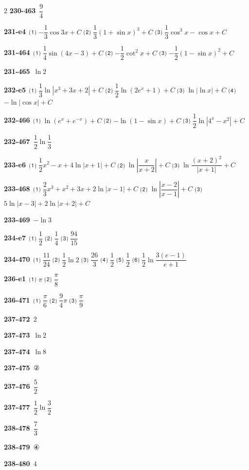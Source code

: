 \documentclass[10pt,a4paper]{article}
\begin{document}
\begin{multicols}{2}
\noindent\textbf{230-463}\ $\dfrac{9}{4}$\par
\noindent\textbf{231-e4}\ ⑴ $-\dfrac{1}{3}\cos 3x+C$ ⑵ $\dfrac{1}{3}(1+\sin x)^3+C$ ⑶ $\dfrac{1}{3}\cos^3 x-\cos x+C$\par
\noindent\textbf{231-464}\ ⑴ $\dfrac{1}{4}\sin(4x-3)+C$ ⑵ $-\dfrac{1}{2}\cot^2 x+C$ ⑶ $-\dfrac{1}{2}(1-\sin x)^2+C$\par
\noindent\textbf{231-465}\ $\ln 2$\par
\noindent\textbf{232-e5}\ ⑴ $\dfrac{1}{3}\ln|x^3+3x+2|+C$ ⑵ $\dfrac{1}{2}\ln(2e^x+1)+C$ ⑶ $\ln|\ln x|+C$ ⑷ $-\ln|\cos x|+C$\par
\noindent\textbf{232-466}\ ⑴ $\ln(e^x+e^{-x})+C$ ⑵ $-\ln(1-\sin x)+C$ ⑶ $\dfrac{1}{2}\ln|4^x-x^2|+C$\par
\noindent\textbf{232-467}\ $\dfrac{1}{2}\ln\dfrac{1}{3}$\par
\noindent\textbf{233-e6}\ ⑴ $\dfrac{1}{2}x^2-x+4\ln|x+1|+C$ ⑵ $\ln\left|\dfrac{x}{x+2}\right|+C$ ⑶ $\ln\dfrac{(x+2)^2}{|x+1|}+C$\par
\noindent\textbf{233-468}\ ⑴ $\dfrac{2}{3}x^3+x^2+3x+2\ln|x-1|+C$ ⑵ $\ln\left|\dfrac{x-2}{x-1}\right|+C$ ⑶ $5\ln|x-3|+2\ln|x+2|+C$\par
\noindent\textbf{233-469}\ $-\ln 3$\par
\noindent\textbf{234-e7}\ ⑴ $\dfrac{1}{2}$ ⑵ $\dfrac{1}{4}$ ⑶ $\dfrac{94}{15}$\par
\noindent\textbf{234-470}\ ⑴ $\dfrac{11}{24}$ ⑵ $\dfrac{1}{2}\ln 2$ ⑶ $\dfrac{26}{3}$ ⑷ $\dfrac{1}{2}$ ⑸ $\dfrac{1}{2}$ ⑹ $\dfrac{1}{2}\ln\dfrac{3(e-1)}{e+1}$\par
\noindent\textbf{236-e1}\ ⑴ $\pi$ ⑵ $\dfrac{\pi}{8}$\par
\noindent\textbf{236-471}\ ⑴ $\dfrac{\pi}{6}$ ⑵ $\dfrac{9}{4}\pi$ ⑶ $\dfrac{\pi}{9}$\par
\noindent\textbf{237-472}\ $2$\par
\noindent\textbf{237-473}\ $\ln 2$\par
\noindent\textbf{237-474}\ $\ln 8$\par
\noindent\textbf{237-475}\ ②\par
\noindent\textbf{237-476}\ $\dfrac{5}{2}$\par
\noindent\textbf{237-477}\ $\dfrac{1}{2}\ln\dfrac{3}{2}$\par
\noindent\textbf{238-478}\ $\dfrac{7}{3}$\par
\noindent\textbf{238-479}\ ④\par
\noindent\textbf{238-480}\ $4$\par

\end{multicols}
\end{document}

